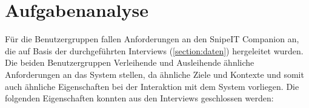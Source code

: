 

\section{Aufgabenanalyse}
\label{section:aufgaben}
Für die Benutzergruppen fallen Anforderungen an den SnipeIT Companion an, die
auf Basis der durchgeführten Interviews (\ref{section:daten}) hergeleitet
wurden. Die beiden Benutzergruppen Verleihende und Ausleihende ähnliche Anforderungen an das System stellen, da ähnliche
Ziele und Kontexte und somit auch ähnliche Eigenschaften bei der Interaktion mit
dem System vorliegen. Die folgenden Eigenschaften konnten aus den Interviews
geschlossen werden:

